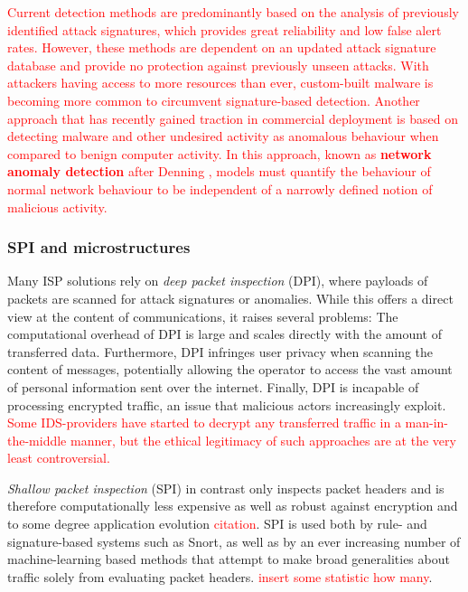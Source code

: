\textcolor{red}{Current detection methods are predominantly based on the analysis of previously identified attack signatures, which provides great reliability and low false alert rates. However, these methods are dependent on an updated attack signature database and provide no protection against previously unseen attacks. With attackers having access to more resources than ever, custom-built malware is becoming more common to circumvent signature-based detection. 
Another approach that has recently gained traction in commercial deployment is based on detecting malware and other undesired activity as anomalous behaviour when compared to benign computer activity. In this approach, known as \textbf{network anomaly detection} after Denning \cite{denning1987intrusion}, models must quantify the behaviour of normal network behaviour to be independent of a narrowly defined notion of malicious activity.
}


\subsubsection{SPI and microstructures}

Many ISP solutions rely on \emph{deep packet inspection} (DPI), where payloads of packets are scanned for attack signatures or anomalies. While this offers a direct view at the content of communications, it raises several problems: The computational overhead of DPI is large and scales directly with the amount of transferred data. Furthermore, DPI infringes user privacy when scanning the content of messages, potentially allowing the operator to access the vast amount of personal information sent over the internet. Finally, DPI is incapable of processing encrypted traffic, an issue that malicious actors increasingly exploit. \textcolor{red}{Some IDS-providers have started to decrypt any transferred traffic in a man-in-the-middle manner, but the ethical legitimacy of such approaches are at the very least controversial.}

\emph{Shallow packet inspection} (SPI) in contrast only inspects packet headers and is therefore computationally less expensive as well as robust against encryption and to some degree application evolution \textcolor{red}{citation}. SPI is used both by rule- and signature-based systems such as Snort, as well as by an ever increasing number of machine-learning based methods that attempt to make broad generalities about traffic solely from evaluating packet headers. \textcolor{red}{insert some statistic how many}.

